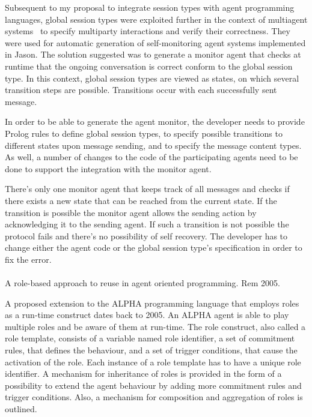 \documentclass[a4paper,12pt,oneside,fleqn]{book} %
\theoremstyle{plain}
\theoremstyle{definition}
\theoremstyle{remark}
\begin{document}
Subsequent to my proposal to integrate session types with agent programming
languages, global session types were exploited further in the context of
multiagent systems~\cite{} to specify multiparty interactions and verify
their correctness. They were used for automatic generation of
self-monitoring agent systems implemented in Jason. The solution suggested
was to generate a monitor agent that checks at runtime that the ongoing
conversation is correct conform to the global session type. In this
context, global session types are viewed as states, on which several
transition steps are possible. Transitions occur with each successfully sent
message.

In order to be able to generate the agent monitor, the developer needs to
provide Prolog rules to define global session types, to specify possible
transitions to different states upon message sending, and to specify the
message content types. As well, a number of changes to the code of the
participating agents need to be done to support the integration with the
monitor agent. 

There's only one monitor agent that keeps track of all messages and checks
if there exists a new state that can be reached from the current state. If
the transition is possible the monitor agent allows the sending action by
acknowledging it to the sending agent. If such a transition is not
possible the protocol fails and there's no possibility of self recovery.
The developer has to change either the agent code or the global session
type's specification in order to fix the error. 
\\~\\

A role-based approach to reuse in agent oriented programming. Rem 2005.

A proposed extension to the ALPHA programming language that employs roles
as a run-time construct dates back to 2005\cite{}. An ALPHA agent is able
to play multiple roles and be aware of them at run-time. The role
construct, also called a role template, consists of a variable named role
identifier, a set of commitment rules, that defines the behaviour, and a
set of trigger conditions, that cause the activation of the role. Each
instance of a role template has to have a unique role identifier. A
mechanism for inheritance of roles is provided in the form of a possibility
to  extend the agent behaviour by adding more commitment rules and trigger
conditions.  Also, a mechanism for composition and aggregation of roles
is outlined.
\end{document}
